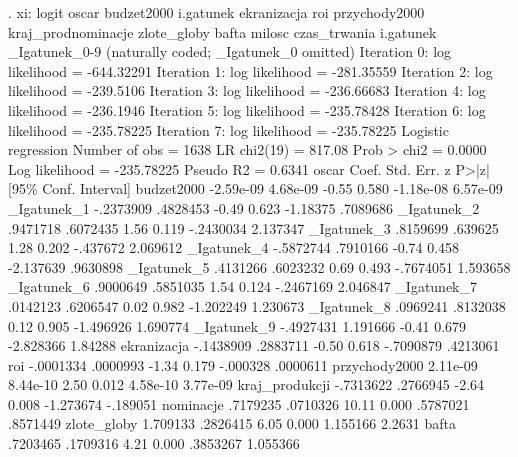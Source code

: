 \begin{stlog}

. xi: logit oscar  budzet2000 i.gatunek ekranizacja roi przychody2000 kraj_prodnominacje zlote_globy bafta
 milosc czas_trwania
i.gatunek         _Igatunek_0-9       (naturally coded; _Igatunek_0 omitted)
{\smallskip}
Iteration 0:   log likelihood = -644.32291  
Iteration 1:   log likelihood = -281.35559  
Iteration 2:   log likelihood =  -239.5106  
Iteration 3:   log likelihood = -236.66683  
Iteration 4:   log likelihood =  -236.1946  
Iteration 5:   log likelihood = -235.78428  
Iteration 6:   log likelihood = -235.78225  
Iteration 7:   log likelihood = -235.78225  
{\smallskip}
Logistic regression                               Number of obs   =       1638
                                                  LR chi2(19)     =     817.08
                                                  Prob > chi2     =     0.0000
Log likelihood = -235.78225                       Pseudo R2       =     0.6341
{\smallskip}
         oscar {\VBAR}      Coef.   Std. Err.      z    P>|z|     [95\% Conf. Interval]
    budzet2000 {\VBAR}  -2.59e-09   4.68e-09    -0.55   0.580    -1.18e-08    6.57e-09
   _Igatunek_1 {\VBAR}  -.2373909   .4828453    -0.49   0.623     -1.18375    .7089686
   _Igatunek_2 {\VBAR}   .9471718   .6072435     1.56   0.119    -.2430034    2.137347
   _Igatunek_3 {\VBAR}   .8159699    .639625     1.28   0.202     -.437672    2.069612
   _Igatunek_4 {\VBAR}  -.5872744   .7910166    -0.74   0.458    -2.137639    .9630898
   _Igatunek_5 {\VBAR}   .4131266   .6023232     0.69   0.493    -.7674051    1.593658
   _Igatunek_6 {\VBAR}   .9000649   .5851035     1.54   0.124    -.2467169    2.046847
   _Igatunek_7 {\VBAR}   .0142123   .6206547     0.02   0.982    -1.202249    1.230673
   _Igatunek_8 {\VBAR}   .0969241   .8132038     0.12   0.905    -1.496926    1.690774
   _Igatunek_9 {\VBAR}  -.4927431   1.191666    -0.41   0.679    -2.828366     1.84288
   ekranizacja {\VBAR}  -.1438909   .2883711    -0.50   0.618    -.7090879    .4213061
           roi {\VBAR}  -.0001334   .0000993    -1.34   0.179     -.000328    .0000611
 przychody2000 {\VBAR}   2.11e-09   8.44e-10     2.50   0.012     4.58e-10    3.77e-09
kraj_produkcji {\VBAR}  -.7313622   .2766945    -2.64   0.008    -1.273674    -.189051
     nominacje {\VBAR}   .7179235   .0710326    10.11   0.000     .5787021    .8571449
   zlote_globy {\VBAR}   1.709133   .2826415     6.05   0.000     1.155166      2.2631
         bafta {\VBAR}   .7203465   .1709316     4.21   0.000     .3853267    1.055366

\end{stlog}
